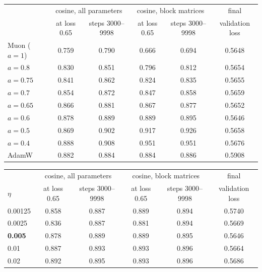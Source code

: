 \begin{center}\small
\captionsetup{type=table}
\caption{Choice of $a$: smoothed Muon at Muon's learning rate $\eta=0.005$, data order 0. Bold: the chosen value.}
\label{tab:app-calib}
\begin{tabular}{@{}l|cc|cc|c@{}}
 & \multicolumn{2}{c|}{cosine, all parameters} & \multicolumn{2}{c|}{cosine, block matrices} & final \\
 & at loss 0.65 & steps 3000--9998 & at loss 0.65 & steps 3000--9998 & validation loss \\
\hline
Muon ($a=1$) & 0.759 & 0.790 & 0.666 & 0.694 & 0.5648 \\
$a=0.8$ &0.830 & 0.851 & 0.796 & 0.812 & 0.5654 \\
$a=0.75$ &0.841 & 0.862 & 0.824 & 0.835 & 0.5655 \\
$a=0.7$ &0.854 & 0.872 & 0.847 & 0.858 & 0.5659 \\
$a=0.65$ &0.866 & 0.881 & 0.867 & 0.877 & 0.5652 \\
{\boldmath$a=0.6$} &0.878 & 0.889 & 0.889 & 0.895 & 0.5646 \\
$a=0.5$ &0.869 & 0.902 & 0.917 & 0.926 & 0.5658 \\
$a=0.4$ &0.888 & 0.908 & 0.951 & 0.951 & 0.5676 \\
\hline
AdamW & 0.882 & 0.884 & 0.884 & 0.886 & 0.5908 \\
\hline
\end{tabular}
\end{center}

\begin{center}\small
\captionsetup{type=table}
\caption{Choice of $\eta$: smoothed Muon with $a=0.6$, data order 0. Bold: the chosen value.}
\label{tab:app-lr}
\begin{tabular}{@{}l|cc|cc|c@{}}
 & \multicolumn{2}{c|}{cosine, all parameters} & \multicolumn{2}{c|}{cosine, block matrices} & final \\
$\eta$ & at loss 0.65 & steps 3000--9998 & at loss 0.65 & steps 3000--9998 & validation loss \\
\hline
0.00125 & 0.858 & 0.887 & 0.889 & 0.894 & 0.5740 \\
0.0025 & 0.836 & 0.887 & 0.881 & 0.894 & 0.5669 \\
\textbf{0.005} & 0.878 & 0.889 & 0.889 & 0.895 & 0.5646 \\
0.01 & 0.887 & 0.893 & 0.893 & 0.896 & 0.5664 \\
0.02 & 0.892 & 0.895 & 0.893 & 0.896 & 0.5686 \\
\hline
\end{tabular}
\end{center}

